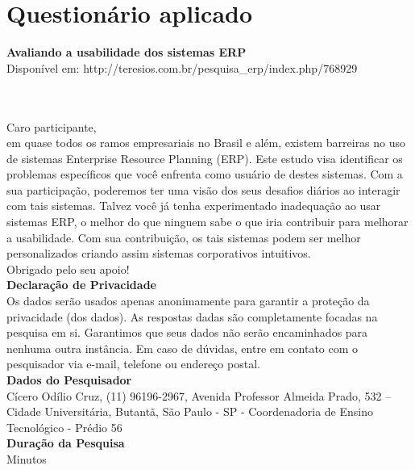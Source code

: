 \chapter{Questionário aplicado}
\newcommand\Factor{1.9}

\noindent \begin{center}
\textbf{Avaliando a usabilidade dos sistemas ERP} \\	
Disponível em: http://teresios.com.br/pesquisa\_erp/index.php/768929
\end{center}
\\
\\
\noindent Caro participante,\\
\noindent em quase todos os ramos empresariais no Brasil e além, existem barreiras no uso de sistemas Enterprise Resource Planning (ERP). Este estudo visa identificar os problemas específicos que você enfrenta como usuário de destes sistemas. Com a sua participação, poderemos ter uma visão dos seus desafios diários ao interagir com tais sistemas. Talvez você já tenha experimentado inadequação ao usar sistemas ERP, o melhor do que ninguem sabe o que iria contribuir para melhorar a usabilidade. Com sua contribuição, os tais sistemas podem ser melhor personalizados criando assim sistemas corporativos intuitivos.\\
\noindent Obrigado pelo seu apoio!\\

\noindent \textbf{Declaração de Privacidade}\\
\noindent Os dados serão usados apenas anonimamente para garantir a proteção da privacidade (dos dados). As respostas dadas são completamente focadas na pesquisa em si. Garantimos que seus dados não serão encaminhados para nenhuma outra instância. Em caso de dúvidas, entre em contato com o pesquisador via e-mail, telefone ou endereço postal.\\

\noindent \textbf{Dados do Pesquisador}\\
\noindent Cícero Odílio Cruz, (11) 96196-2967, Avenida Professor Almeida Prado, 532 – Cidade Universitária, Butantã, São Paulo - SP - Coordenadoria de Ensino Tecnológico - Prédio 56\\

\noindent  \textbf{Duração da Pesquisa}\\
 Minutos\\

